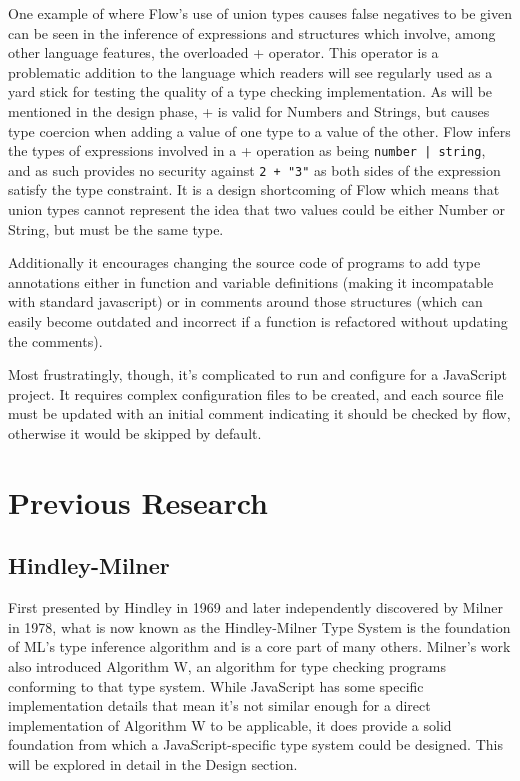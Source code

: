 \documentclass[british, twoside]{bhamthesis}
\theoremstyle{definition}
\begin{document}
    One example of where Flow's use of union types causes false negatives to be given can be seen in the inference of expressions and structures which involve, among other language features, the overloaded + operator. This operator is a problematic addition to the language which readers will see regularly used as a yard stick for testing the quality of a type checking implementation. As will be mentioned in the design phase, + is valid for Numbers and Strings, but causes type coercion when adding a value of one type to a value of the other. Flow infers the types of expressions involved in a + operation as being \texttt{number | string}, and as such provides no security against \texttt{2 + "3"} as both sides of the expression satisfy the type constraint. It is a design shortcoming of Flow which means that union types cannot represent the idea that two values could be either Number or String, but must be the same type.

    Additionally it encourages changing the source code of programs to add type annotations either in function and variable definitions (making it incompatable with standard javascript) or in comments around those structures (which can easily become outdated and incorrect if a function is refactored without updating the comments).

    Most frustratingly, though, it's complicated to run and configure for a JavaScript project. It requires complex configuration files to be created, and each source file must be updated with an initial comment indicating it should be checked by flow, otherwise it would be skipped by default.

  \section{Previous Research}

    \subsection{Hindley-Milner}
      First presented by Hindley in 1969 and later independently discovered by Milner in 1978, what is now known as the Hindley-Milner Type System is the foundation of ML's type inference algorithm and is a core part of many others\autocite{Hindley1969}. Milner's work also introduced Algorithm W, an algorithm for type checking programs conforming to that type system\autocite{Milner1978}. While JavaScript has some specific implementation details that mean it's not similar enough for a direct implementation of Algorithm W to be applicable, it does provide a solid foundation from which a JavaScript-specific type system could be designed. This will be explored in detail in the Design section.
\end{document}
